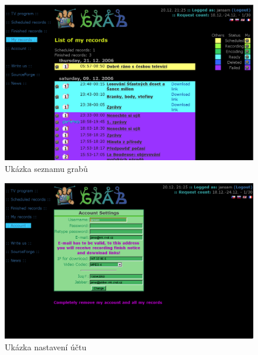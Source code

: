 \documentclass[11pt,twoside,a4paper]{dp_format}%
\begin{document}
\begin{figure}[ht]
\begin{center}
\includegraphics[width=12cm]{images/scrSeznam.eps}
\caption{Ukázka seznamu grabů}
\label{fig:dvbgrab}
\end{center}
\end{figure}

\begin{figure}[ht]
\begin{center}
\includegraphics[width=12cm]{images/scrNastaveni.eps}
\caption{Ukázka nastavení účtu}
\label{fig:dvbgrab}
\end{center}
\end{figure}

\cleardoublepage


\cleardoublepage


\cleardoublepage


\cleardoublepage
\end{document}
